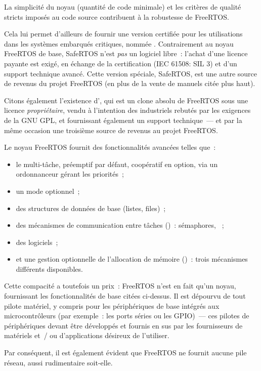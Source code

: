 La simplicité du noyau (quantité de code minimale) et les critères de
qualité stricts imposés au code source contribuent à la robustesse
de FreeRTOS.

Cela lui permet d'ailleurs de fournir une version certifiée
pour les utilisations dans les systèmes embarqués critiques, nommée
. Contrairement au noyau FreeRTOS de base, SafeRTOS
n'est \emph{pas} un logiciel libre~: l'achat d'une licence payante est
exigé, en échange de la certification (IEC 61508: SIL 3) et d'un support
technique avancé. Cette version spéciale, SafeRTOS, est une autre source de
revenus du projet FreeRTOS (en plus de la vente de manuels citée plus haut).

Citons également l'existence d', qui est un clone absolu
de FreeRTOS sous une licence \emph{propriétaire}, vendu à l'intention des
industriels rebutés par les exigences de la GNU GPL, et fournissant
également un support technique~--- et par la même occasion une troisième
source de revenus au projet FreeRTOS.

\medskip

Le noyau FreeRTOS fournit des fonctionnalités avancées telles que~:
\begin{itemize}
\item le multi-tâche, préemptif par défaut, coopératif en option,
via un ordonnanceur gérant les priorités~;
\item un mode  optionnel~;
\item des structures de données de base (listes, files)~;
\item des mécanismes de communication entre tâches ()~: sémaphores, ~;
\item des  logiciels~;
\item et une gestion optionnelle de l'allocation de mémoire
()~: trois mécanismes différents disponibles.
\end{itemize}

Cette compacité a toutefois un prix~: FreeRTOS n'est en fait qu'un
noyau, fournissant les fonctionnalités de base citées ci-dessus.
Il est dépourvu de tout pilote matériel, y compris pour les périphériques
de base intégrés aux microcontrôleurs (par exemple~: les ports séries ou
les GPIO)~--- ces pilotes de périphériques devant être développés et
fournis en sus par les fournisseurs de matériels et~/ ou d'applications
désireux de l'utiliser.

Par conséquent, il est également évident que FreeRTOS ne fournit aucune
pile réseau, aussi rudimentaire soit-elle.

